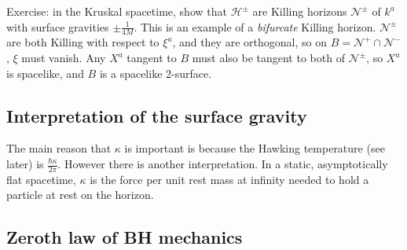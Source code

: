 \documentclass{jknotes}
\begin{document}
Exercise: in the Kruskal spacetime, show that \(\mathcal{H}^\pm\) are Killing horizons \(\mathcal{N}^\pm\) of \(k^a\) with surface gravities \(\pm\frac{1}{4M}\). This is an example of a \emph{bifurcate} Killing horizon. \(\mathcal{N}^\pm\) are both Killing with respect to \(\xi^a\), and they are orthogonal, so on \(B = \mathcal{N}^+\cap\mathcal{N}^-\), \(\xi\) must vanish. Any \(X^a\) tangent to \(B\) must also be tangent to both of \(\mathcal{N}^\pm\), so \(X^a\) is spacelike, and \(B\) is a spacelike 2-surface.

\subsection{Interpretation of the surface gravity}
The main reason that \(\kappa\) is important is because the Hawking temperature (see later) is \(\frac{\hbar\kappa}{2\pi}\). However there is another interpretation. In a static, asymptotically flat spacetime, \(\kappa\) is the force per unit rest mass at infinity needed to hold a particle at rest on the horizon.

\subsection{Zeroth law of BH mechanics}
\end{document}
